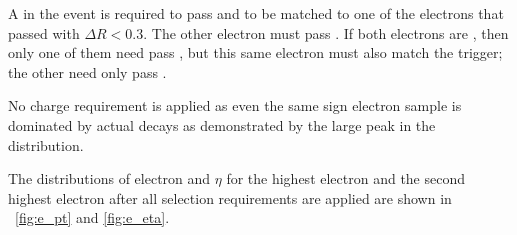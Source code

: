 A \CentralElectron in the event is required to pass \EGTIGHT and to be matched
to one of the electrons that passed \SingleElectronTrigger with $\Delta R <
0.3$. The other electron must pass \EGMEDIUM. If both electrons are
\CentralElectrons, then only one of them need pass \EGTIGHT, but this same
electron must also match the trigger; the other \CentralElectron need only pass
\EGMEDIUM.

No charge requirement is applied as even the same sign electron sample is
dominated by actual \Z decays as demonstrated by the large peak in the \mee
distribution.

The distributions of electron \pt and $\eta$ for the highest \pt electron and
the second highest \pt electron after all selection requirements are applied
are shown in \FIGS~\ref{fig:e_pt} and \ref{fig:e_eta}.

